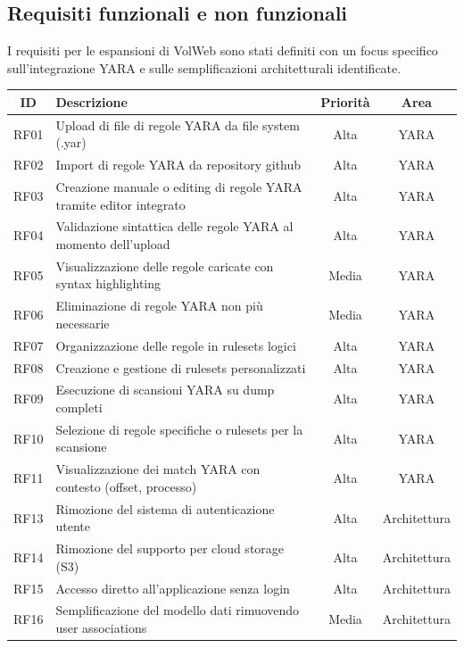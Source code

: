 \subsection{Requisiti funzionali e non funzionali}

I requisiti per le espansioni di VolWeb sono stati definiti con un focus specifico sull'integrazione YARA e sulle semplificazioni architetturali identificate.

\begin{tabularx}{\textwidth}{|c|X|c|c|}
\caption{Requisiti Funzionali del Sistema}
\label{tab:requisiti-funzionali} \\
\hline
\textbf{ID} & \textbf{Descrizione} & \textbf{Priorità} & \textbf{Area} \\
\hline
RF01 & Upload di file di regole YARA da file system (.yar) & Alta & YARA \\
\hline
RF02 & Import di regole YARA da repository github & Alta & YARA \\
\hline
RF03 & Creazione manuale o editing di regole YARA tramite editor integrato & Alta & YARA \\
\hline
RF04 & Validazione sintattica delle regole YARA al momento dell'upload & Alta & YARA \\
\hline
RF05 & Visualizzazione delle regole caricate con syntax highlighting & Media & YARA \\
\hline
RF06 & Eliminazione di regole YARA non più necessarie & Media & YARA \\
\hline
RF07 & Organizzazione delle regole in rulesets logici & Alta & YARA \\
\hline
RF08 & Creazione e gestione di rulesets personalizzati & Alta & YARA \\
\hline
RF09 & Esecuzione di scansioni YARA su dump completi & Alta & YARA \\
\hline
RF10 & Selezione di regole specifiche o rulesets per la scansione & Alta & YARA \\
\hline
RF11 & Visualizzazione dei match YARA con contesto (offset, processo) & Alta & YARA \\
\hline
RF13 & Rimozione del sistema di autenticazione utente & Alta & Architettura \\
\hline
RF14 & Rimozione del supporto per cloud storage (S3) & Alta & Architettura \\
\hline
RF15 & Accesso diretto all'applicazione senza login & Alta & Architettura \\
\hline
RF16 & Semplificazione del modello dati rimuovendo user associations & Media & Architettura \\
\hline
\end{tabularx}

